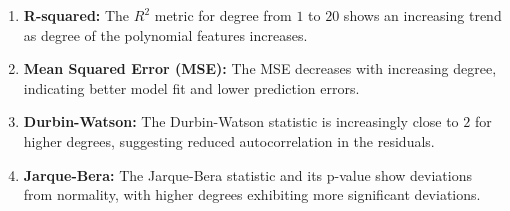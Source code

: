 \begin{enumerate}[label=(\alph*)]
    \item \textbf{R-squared:} The $R^2$ metric for degree from $1$ to $20$ shows an increasing trend as degree of the polynomial features increases. 
    \item \textbf{Mean Squared Error (MSE):} The MSE decreases with increasing degree, indicating better model fit and lower prediction errors.
    \item \textbf{Durbin-Watson:} The Durbin-Watson statistic is increasingly close to $2$ for higher degrees, suggesting reduced autocorrelation in the residuals.
    \item \textbf{Jarque-Bera:} The Jarque-Bera statistic and its p-value show deviations from normality, with higher degrees exhibiting more significant deviations.
\end{enumerate}

\clearpage